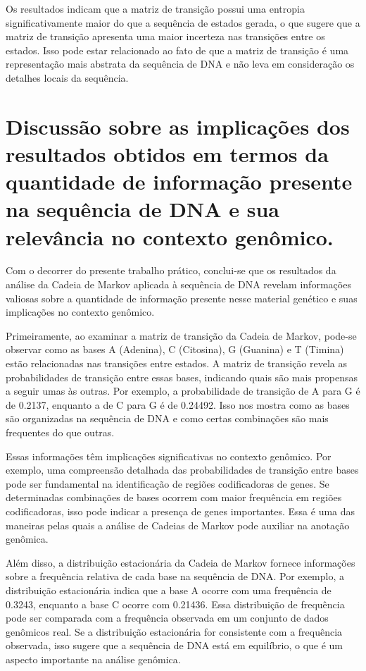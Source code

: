 \documentclass{article}
\begin{document}
    Os resultados indicam que a matriz de transição possui uma entropia significativamente maior do que a sequência de estados gerada, o que sugere que a matriz de transição apresenta uma maior incerteza nas transições entre os estados. Isso pode estar relacionado ao fato de que a matriz de transição é uma representação mais abstrata da sequência de DNA e não leva em consideração os detalhes locais da sequência.


    \section{Discussão sobre as implicações dos resultados obtidos em termos da quantidade de informação presente na sequência de DNA e sua relevância no contexto genômico.}

    Com o decorrer do presente trabalho prático, conclui-se que os resultados da análise da Cadeia de Markov aplicada à sequência de DNA revelam informações valiosas sobre a quantidade de informação presente nesse material genético e suas implicações no contexto genômico.
    
    Primeiramente, ao examinar a matriz de transição da Cadeia de Markov, pode-se observar como as bases A (Adenina), C (Citosina), G (Guanina) e T (Timina) estão relacionadas nas transições entre estados. A matriz de transição revela as probabilidades de transição entre essas bases, indicando quais são mais propensas a seguir umas às outras. Por exemplo, a probabilidade de transição de A para G é de 0.2137, enquanto a de C para G é de 0.24492. Isso nos mostra como as bases são organizadas na sequência de DNA e como certas combinações são mais frequentes do que outras.
    
    Essas informações têm implicações significativas no contexto genômico. Por exemplo, uma compreensão detalhada das probabilidades de transição entre bases pode ser fundamental na identificação de regiões codificadoras de genes. Se determinadas combinações de bases ocorrem com maior frequência em regiões codificadoras, isso pode indicar a presença de genes importantes. Essa é uma das maneiras pelas quais a análise de Cadeias de Markov pode auxiliar na anotação genômica.
    
    Além disso, a distribuição estacionária da Cadeia de Markov fornece informações sobre a frequência relativa de cada base na sequência de DNA. Por exemplo, a distribuição estacionária indica que a base A ocorre com uma frequência de 0.3243, enquanto a base C ocorre com 0.21436. Essa distribuição de frequência pode ser comparada com a frequência observada em um conjunto de dados genômicos real. Se a distribuição estacionária for consistente com a frequência observada, isso sugere que a sequência de DNA está em equilíbrio, o que é um aspecto importante na análise genômica.
    
\end{document}
